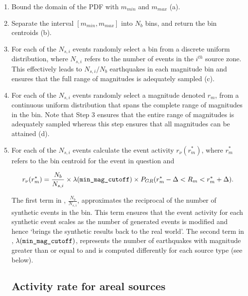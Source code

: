 \begin{enumerate}
\item Bound the domain of the PDF with $m_{min}$ and $m_{max}$
(a).

\item Separate the interval $[m_{min}, m_{max}]$ into $N_b$ bins,
and return the bin centroids (b).

\item For each of the $N_{s,i}$ events randomly select a bin from
a discrete uniform
  distribution, where $N_{s,i}$ refers to the number of events in the $i^{th}$ source zone.
  This effectively leads to $N_{s,i}/N_b$ earthquakes in
  each magnitude bin and ensures that the full range of magnitudes
  is adequately sampled (c).

\item For each of the $N_{s,i}$ events randomly select a magnitude
denoted $r_m$, from a
  continuous uniform distribution that spans the complete range of magnitudes in the
  bin. Note that Step 3 ensures that the entire range of magnitudes is
  adequately sampled whereas this step ensures that all magnitudes can be
  attained (d).

\item For each of the $N_{s,i}$ events calculate the event
activity $r_\nu(r_m^*)$, where $r_m^*$ refers to the bin centroid
for the event in question and

\begin{equation}
\label{eq:event-activity} r_\nu(r_m^*) = \frac{N_b}{N_{s,i}}
\times \lambda(\typepar{min}{\_mag}{\_cutoff}) \times
P_{GR}(r_m^*-\Delta<R_m<r_m^*+\Delta).
\end{equation}

The first term in , $\frac{N_b}{N_{s,i}}$,
approximates the reciprocal of the number of synthetic events in
the bin. This term ensures that the event activity for each
synthetic event scales as the number of generated events is
modified and hence `brings the synthetic results back to the real
world'. The second term in ,
$\lambda(\typepar{min}{\_mag}{\_cutoff})$, represents the number
of earthquakes with magnitude greater than or equal to
 and is computed differently for each source type (see below).

\subsection{Activity rate for areal sources} 
\label{sec:rv_areal_GR}



\end{enumerate}
